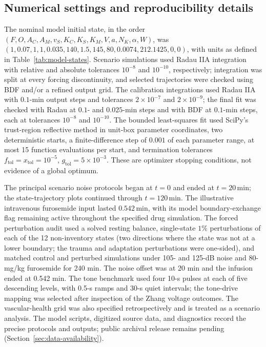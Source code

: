 \documentclass[final,5p,times]{elsarticle}
\begin{document}
\subsection{Numerical settings and reproducibility details}\label{sec:reproducibility}

The nominal model initial state, in the order \((F,O,A_C,A_M,v_S,K_C,K_S,K_M,V,a,N_K,\alpha,W)\), was \((1,0.07,1,1,0.035,140,1.5,145,80,0.0074,212.1425,0,0)\), with units as defined in Table~\ref{tab:model-states}. Scenario simulations used Radau IIA integration with relative and absolute tolerances \(10^{-8}\) and \(10^{-10}\), respectively; integration was split at every forcing discontinuity, and selected trajectories were checked using BDF and/or a refined output grid. The calibration integrations used Radau IIA with \(0.1\)-min output steps and tolerances \(2\times10^{-7}\) and \(2\times10^{-9}\); the final fit was checked with Radau at \(0.1\)- and \(0.025\)-min steps and with BDF at \(0.1\)-min steps, each at tolerances \(10^{-8}\) and \(10^{-10}\). The bounded least-squares fit used SciPy's trust-region reflective method in unit-box parameter coordinates, two deterministic starts, a finite-difference step of \(0.001\) of each parameter range, at most 15 function evaluations per start, and termination tolerances \(f_{\mathrm{tol}}=x_{\mathrm{tol}}=10^{-5}\), \(g_{\mathrm{tol}}=5\times10^{-3}\). These are optimizer stopping conditions, not evidence of a global optimum.

The principal scenario noise protocols began at \(t=0\) and ended at \(t=20\,\mathrm{min}\); the state-trajectory plots continued through \(t=120\,\mathrm{min}\). The illustrative intravenous furosemide input lasted \(0.542\,\mathrm{min}\), with its model boundary-exchange flag remaining active throughout the specified drug simulation. The forced perturbation audit used a solved resting balance, single-state \(1\%\) perturbations of each of the 12 non-inventory states (two directions where the state was not at a lower boundary; the trauma and adaptation perturbations were one-sided), and matched control and perturbed simulations under 105- and 125-dB noise and 80-mg/kg furosemide for 240 min. The noise offset was at 20 min and the infusion ended at 0.542 min. The tone benchmark used four 10-s pulses at each of five descending levels, with 0.5-s ramps and 30-s quiet intervals; the tone-drive mapping was selected after inspection of the Zhang voltage outcomes. The vascular-health grid was also specified retrospectively and is treated as a scenario analysis. The model scripts, digitized source data, and diagnostics record the precise protocols and outputs; public archival release remains pending (Section~\ref{sec:data-availability}).
\end{document}
